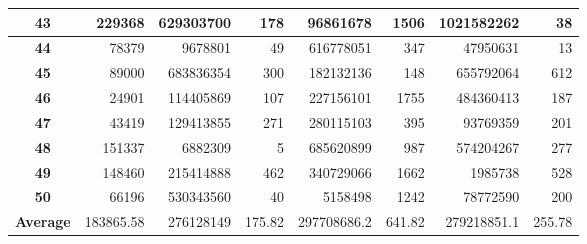 \documentclass[12pt]{article}
\begin{document}
\begin{table}[!htbp]
{\begin{tabular}{crrrrrrr}
\multicolumn{1}{|c|}{\textbf{43}} & \multicolumn{1}{r|}{229368} & \multicolumn{1}{r|}{629303700} & \multicolumn{1}{r|}{178} & \multicolumn{1}{r|}{96861678} & \multicolumn{1}{r|}{1506} & \multicolumn{1}{r|}{1021582262} & \multicolumn{1}{r|}{38} \\ \hline
\multicolumn{1}{|c|}{\textbf{44}} & \multicolumn{1}{r|}{78379} & \multicolumn{1}{r|}{9678801} & \multicolumn{1}{r|}{49} & \multicolumn{1}{r|}{616778051} & \multicolumn{1}{r|}{347} & \multicolumn{1}{r|}{47950631} & \multicolumn{1}{r|}{13} \\ \hline
\multicolumn{1}{|c|}{\textbf{45}} & \multicolumn{1}{r|}{89000} & \multicolumn{1}{r|}{683836354} & \multicolumn{1}{r|}{300} & \multicolumn{1}{r|}{182132136} & \multicolumn{1}{r|}{148} & \multicolumn{1}{r|}{655792064} & \multicolumn{1}{r|}{612} \\ \hline
\multicolumn{1}{|c|}{\textbf{46}} & \multicolumn{1}{r|}{24901} & \multicolumn{1}{r|}{114405869} & \multicolumn{1}{r|}{107} & \multicolumn{1}{r|}{227156101} & \multicolumn{1}{r|}{1755} & \multicolumn{1}{r|}{484360413} & \multicolumn{1}{r|}{187} \\ \hline
\multicolumn{1}{|c|}{\textbf{47}} & \multicolumn{1}{r|}{43419} & \multicolumn{1}{r|}{129413855} & \multicolumn{1}{r|}{271} & \multicolumn{1}{r|}{280115103} & \multicolumn{1}{r|}{395} & \multicolumn{1}{r|}{93769359} & \multicolumn{1}{r|}{201} \\ \hline
\multicolumn{1}{|c|}{\textbf{48}} & \multicolumn{1}{r|}{151337} & \multicolumn{1}{r|}{6882309} & \multicolumn{1}{r|}{5} & \multicolumn{1}{r|}{685620899} & \multicolumn{1}{r|}{987} & \multicolumn{1}{r|}{574204267} & \multicolumn{1}{r|}{277} \\ \hline
\multicolumn{1}{|c|}{\textbf{49}} & \multicolumn{1}{r|}{148460} & \multicolumn{1}{r|}{215414888} & \multicolumn{1}{r|}{462} & \multicolumn{1}{r|}{340729066} & \multicolumn{1}{r|}{1662} & \multicolumn{1}{r|}{1985738} & \multicolumn{1}{r|}{528} \\ \hline
\multicolumn{1}{|c|}{\textbf{50}} & \multicolumn{1}{r|}{66196} & \multicolumn{1}{r|}{530343560} & \multicolumn{1}{r|}{40} & \multicolumn{1}{r|}{5158498} & \multicolumn{1}{r|}{1242} & \multicolumn{1}{r|}{78772590} & \multicolumn{1}{r|}{200} \\ \hline
\multicolumn{1}{|l|}{\textbf{Average}} & \multicolumn{1}{r|}{183865.58} & \multicolumn{1}{r|}{276128149} & \multicolumn{1}{r|}{175.82} & \multicolumn{1}{r|}{297708686.2} & \multicolumn{1}{r|}{641.82} & \multicolumn{1}{r|}{279218851.1} & \multicolumn{1}{r|}{255.78} \\ \hline
\end{tabular}%
}
\end{table}
\end{document}
